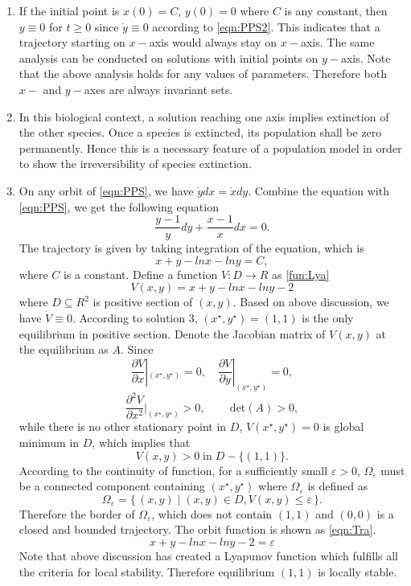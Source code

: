 \begin{enumerate}
\item If the initial point is $x(0)=C$, $y(0)=0$ where $C$ is any constant, then $y \equiv 0$ for $t \geqslant 0$ since $\dot{y} \equiv 0$ according to \eqref{eqn:PPS2}. This indicates that a trajectory starting on $x-$axis would always stay on $x-$axis. The same analysis can be conducted on solutions with initial points on $y-$axis. Note that the above analysis holds for any values of parameters. Therefore both $x-$ and $y-$axes are always invariant sets.
\item In this biological context, a solution reaching one axis implies extinction of the other species. Once a species is extincted, its population shall be zero permanently. Hence this is a necessary feature of a population model in order to show the irreversibility of species extinction.
\item On any orbit of \eqref{eqn:PPS}, we have $\dot{y}dx = \dot{x}dy$. Combine the equation with \eqref{eqn:PPS}, we get the following equation
$$\frac{y-1}{y} dy + \frac{x-1}{x} dx = 0.$$
The trajectory is given by taking integration of the equation, which is
$$x+y-lnx-lny=C,$$
where $C$ is a constant. Define a function $V:D\to R$  as \eqref{fun:Lya}
\begin{equation}\label{fun:Lya}
V(x,y)=x+y-lnx-lny-2
\end{equation}
where $D \subseteq R^2$ is positive section of $(x,y)$. Based on above discussion, we have $\dot{V} \equiv 0$. According to solution 3, $(x^\star,y^\star)=(1,1)$ is the only equilibrium in positive section. Denote the Jacobian matrix of $V(x,y)$ at the equilibrium as $A$. Since 
$$\frac{\partial V}{\partial x}|_{(x^\star,y^\star)} = 0, \quad \frac{\partial V}{\partial y}|_{(x^\star,y^\star)} = 0,$$ 
$$\frac{\partial^2 V}{\partial x^2}|_{(x^\star,y^\star)} > 0, \quad\quad\, \text{det}(A)>0,$$
while there is no other stationary point in $D$, $V(x^\star,y^\star)=0$ is global minimum in $D$, which implies that 
$$V(x,y)>0\; \text{in}\; D-\{(1,1)\}.$$
According to the continuity of function, for a sufficiently small $\varepsilon > 0$, $\Omega_\varepsilon$ must be a connected component containing $(x^\star,y^\star)$ where $\Omega_\varepsilon$ is defined as
$$\Omega_\varepsilon=\{\,(x,y) \mid (x,y) \in D, V(x,y) \leqslant \varepsilon\,\}.$$
Therefore the border of $\Omega_\varepsilon$, which does not contain $(1,1)$ and $(0,0)$ is a closed and bounded trajectory. The orbit function is shown as \eqref{eqn:Tra}.
 \begin{equation} \label{eqn:Tra}
x+y-lnx-lny-2 = \varepsilon
\end{equation}
Note that above discussion has created a Lyapunov function which fulfills all the criteria for local stability. Therefore equilibrium $(1,1)$ is locally stable.
\end{enumerate}